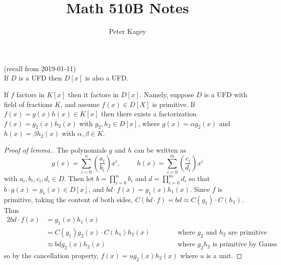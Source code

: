 \documentclass{article}
\newenvironment{theorem}[1][Theorem.]{
  \begin{trivlist} \item[\hskip \labelsep {\bfseries #1}]
}{\end{trivlist}}
\newcommand{\paren}[1]{\left( #1 \right)}
\begin{document}
\title{Math 510B Notes}
\author{Peter Kagey}

\maketitle

\begin{theorem} (recall from 2019-01-11) \\
  If $D$ is a UFD then $D[x]$ is also a UFD.
\end{theorem}
\begin{theorem}[Lemma.]
  If $f$ factors in $K[x]$ then it factors in $D[x]$. Namely,
  suppose $D$ is a UFD with field of fractions $K$, and assume $f(x) \in D[X]$
  is primitive. If $f(x) = g(x)h(x) \in K[x]$ then there exists a factorization
  $f(x) = g_2(x)h_2(x)$ with $g_2, h_2 \in D[x]$, where $g(x) = \alpha g_2(x)$
  and $h(x) = \beta h_2(x)$ with $\alpha, \beta \in K$.
\end{theorem}
\begin{proof}[Proof of lemma.] The polynomials $g$ and $h$ can be written as \[
    g(x) = \sum_{i=0}^n \paren{\frac{a_i}{b_i}} x^i,
    \hspace{1cm}
    h(x) = \sum_{i=0}^m \paren{\frac{c_i}{d_i}} x^i
  \] with $a_i, b_i, c_i, d_i \in D$. Then let $b = \prod_{i=0}^n b_i$ and
  $d = \prod_{i=0}^m d_i$ so that $b\cdot g(x) = g_1(x) \in D[x]$, and
  $bd\cdot f(x) = g_1(x)h_1(x)$. Since $f$ is primitive, taking the content of
  both sides, $C(bd \cdot f) = bd \approx C(g_1)\cdot C(h_1)$.
  Thus \begin{alignat*}{2}
    bd\cdot f(x)
    &= g_1(x)h_1(x) && \\
    &= C(g_1)g_2(x)\cdot C(h_1)h_2(x) \hspace{1cm }&& \text{where $g_2$ and $h_2$ are primitive}\\
    &\approx bd g_2(x)h_2(x) && \text{where $g_2h_2$ is primitive by Gauss}
  \end{alignat*} so by the cancellation property, $f(x) = ug_2(x)h_2(x)$ where
  $u$ is a unit.
\end{proof}
\end{document}

